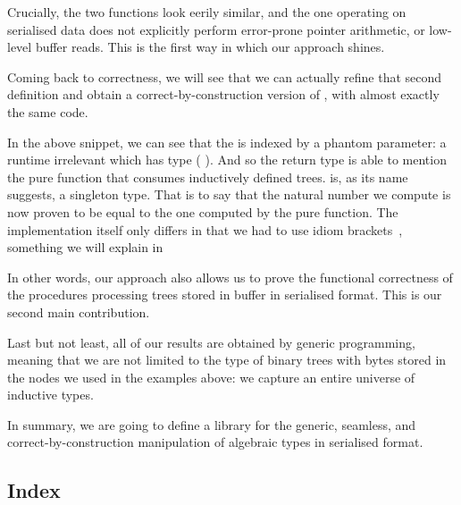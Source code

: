 Crucially, the two functions look eerily similar, and the one operating on
serialised data does not explicitly perform error-prone pointer arithmetic,
or low-level buffer reads. This is the first way in which our approach shines.

Coming back to correctness, we will see that we can actually refine that
second definition and obtain a correct-by-construction version of
, with almost exactly the same code.

\begin{center}
  \begin{minipage}{.7\textwidth}
  \end{minipage}
\end{center}

In the above snippet, we can see that the  is indexed
by a phantom parameter: a runtime irrelevant  which has type
( ).
%
And so the return type is able to mention the pure 
function that consumes inductively defined trees.
%
 is, as its name suggests, a singleton type. That is
to say that the natural number we compute is now proven to be equal to the
one computed by the pure  function.
%
The implementation itself only differs in that we had to use idiom
brackets~\cite{DBLP:journals/jfp/McbrideP08}, something we will explain
in 

In other words, our approach also allows us to prove the functional
correctness of the  procedures processing trees stored
in buffer in serialised format. This is our second main contribution.

Last but not least, all of our results are obtained by generic programming,
meaning that we are not limited to the type of binary trees with bytes stored
in the nodes we used in the examples above: we capture an entire universe of
inductive types.


In summary, we are going to define a library for the
generic,
seamless,
and correct-by-construction
manipulation of algebraic types in serialised format.

\subsection{Index}

